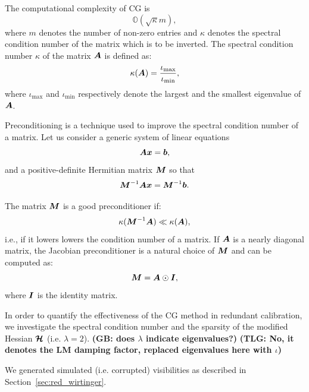 \documentclass[useAMS,usenatbib]{mn2e}
\newcommand{\bA}{\bmath{A}}
\newcommand{\bM}{\bmath{M}}
\newcommand{\bI}{\bmath{I}}
\newcommand{\bb}{\bmath{b}}
\newcommand{\bx}{\bmath{x}}
\newcommand{\bmH}{\bmath{\mathcal{H}}}
\begin{document}
The computational complexity of CG is  
\begin{equation}
\label{eq:cg_bound}
\mathbb{O}(\sqrt{\kappa}m), 
\end{equation}
where $m$ denotes the number of non-zero entries and $\kappa$ denotes the spectral 
condition number of the matrix which is to be inverted. The spectral condition number $\kappa$ of the matrix $\bA$ is defined as:
\begin{equation}
\label{eq:kappa}
\kappa(\bA) = \frac{\iota_{\textrm{max}}}{\iota_{\textrm{min}}}, 
\end{equation}
where $\iota_{\textrm{max}}$ and $\iota_{\textrm{min}}$ respectively denote the largest and the smallest eigenvalue of $\bA$.

Preconditioning is a technique used to improve the spectral condition number of a matrix. Let us consider a generic system of linear equations 
\begin{equation}
\label{eq:prec}
\bA\bx = \bb,
\end{equation}
and a positive-definite Hermitian matrix $\bM$ so that 
\begin{equation}
\label{eq:prec}
\bM^{-1}\bA\bx = \bM^{-1}\bb.
\end{equation}

The matrix $\bM$ is a good preconditioner if:
\begin{equation}
\label{eq:kappa}
\kappa(\bM^{-1}\bA) \ll \kappa(\bA),
\end{equation}
i.e., if it lowers lowers the condition number of a matrix.
If $\bA$ is a nearly diagonal matrix, the Jacobian preconditioner is a natural choice of $\bM$ and can be computed as:
\begin{equation}
\bM = \bA\odot\bI, 
\end{equation}
where $\bI$ is the identity matrix. 


In order to quantify the effectiveness of the CG method in redundant calibration, we investigate the spectral condition number and the sparsity of the modified Hessian $\bmH$ (i.e. $\lambda = 2$).
{\bf (GB: does $\lambda$ indicate eigenvalues?)}
{\bf (TLG: No, it denotes the LM damping factor, replaced eigenvalues here with $\iota$)}

We generated simulated (i.e. corrupted) visibilities as described in Section~\ref{sec:red_wirtinger}. 
\end{document}
